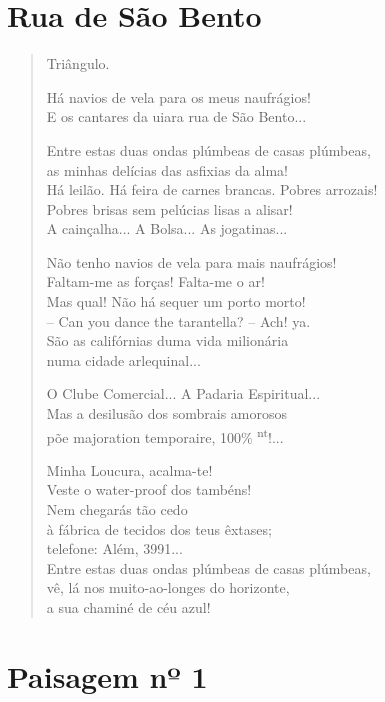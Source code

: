 \chapter{Rua de São Bento}

\begin{verse}
Triângulo.

Há navios de vela para os meus naufrágios!\\
E os cantares da uiara rua de São Bento...

Entre estas duas ondas plúmbeas de casas plúmbeas,\\
as minhas delícias das asfixias da alma!\\
Há leilão. Há feira de carnes brancas. Pobres arrozais!\\
Pobres brisas sem pelúcias lisas a alisar!\\
A cainçalha... A Bolsa... As jogatinas...

Não tenho navios de vela para mais naufrágios!\\
Faltam-me as forças! Falta-me o ar!\\
Mas qual! Não há sequer um porto morto!\\
-- Can you dance the tarantella? -- Ach! ya.\\
São as califórnias duma vida milionária\\
numa cidade arlequinal...

O Clube Comercial... A Padaria Espiritual...\\
Mas a desilusão dos sombrais amorosos\\
põe majoration temporaire, 100\% \textsuperscript{nt}!...

Minha Loucura, acalma-te!\\
Veste o water-proof dos tambéns!\\
Nem chegarás tão cedo\\
à fábrica de tecidos dos teus êxtases;\\
telefone: Além, 3991...\\
Entre estas duas ondas plúmbeas de casas plúmbeas,\\
vê, lá nos muito-ao-longes do horizonte,\\
a sua chaminé de céu azul!
\end{verse}

\chapter{Paisagem nº 1}

